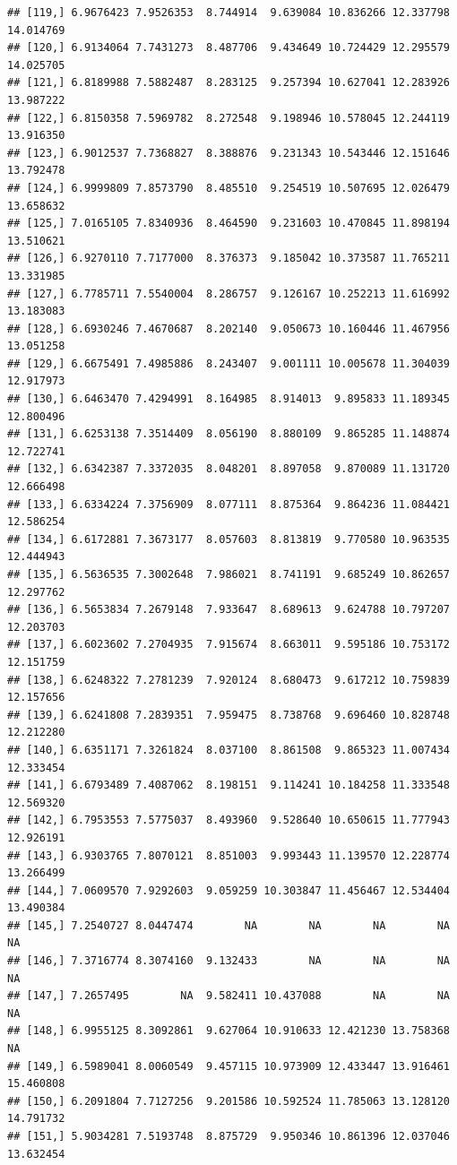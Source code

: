 \documentclass{article}\usepackage[]{graphicx}\usepackage[]{color}
\makeatletter
\newenvironment{kframe}{%
 \def\at@end@of@kframe{}%
 \ifinner\ifhmode%
  \def\at@end@of@kframe{\end{minipage}}%
  \begin{minipage}{\columnwidth}%
 \fi\fi%
 \def\FrameCommand##1{\hskip\@totalleftmargin \hskip-\fboxsep
 \colorbox{shadecolor}{##1}\hskip-\fboxsep
     \hskip-\linewidth \hskip-\@totalleftmargin \hskip\columnwidth}%
 \MakeFramed {\advance\hsize-\width
   \@totalleftmargin\z@ \linewidth\hsize
   \@setminipage}}%
 {\par\unskip\endMakeFramed%
 \at@end@of@kframe}
\newenvironment{knitrout}{}{} %
\makeatother
\begin{document}
\begin{knitrout}
\begin{kframe}
\begin{verbatim}
## [119,] 6.9676423 7.9526353  8.744914  9.639084 10.836266 12.337798 14.014769
## [120,] 6.9134064 7.7431273  8.487706  9.434649 10.724429 12.295579 14.025705
## [121,] 6.8189988 7.5882487  8.283125  9.257394 10.627041 12.283926 13.987222
## [122,] 6.8150358 7.5969782  8.272548  9.198946 10.578045 12.244119 13.916350
## [123,] 6.9012537 7.7368827  8.388876  9.231343 10.543446 12.151646 13.792478
## [124,] 6.9999809 7.8573790  8.485510  9.254519 10.507695 12.026479 13.658632
## [125,] 7.0165105 7.8340936  8.464590  9.231603 10.470845 11.898194 13.510621
## [126,] 6.9270110 7.7177000  8.376373  9.185042 10.373587 11.765211 13.331985
## [127,] 6.7785711 7.5540004  8.286757  9.126167 10.252213 11.616992 13.183083
## [128,] 6.6930246 7.4670687  8.202140  9.050673 10.160446 11.467956 13.051258
## [129,] 6.6675491 7.4985886  8.243407  9.001111 10.005678 11.304039 12.917973
## [130,] 6.6463470 7.4294991  8.164985  8.914013  9.895833 11.189345 12.800496
## [131,] 6.6253138 7.3514409  8.056190  8.880109  9.865285 11.148874 12.722741
## [132,] 6.6342387 7.3372035  8.048201  8.897058  9.870089 11.131720 12.666498
## [133,] 6.6334224 7.3756909  8.077111  8.875364  9.864236 11.084421 12.586254
## [134,] 6.6172881 7.3673177  8.057603  8.813819  9.770580 10.963535 12.444943
## [135,] 6.5636535 7.3002648  7.986021  8.741191  9.685249 10.862657 12.297762
## [136,] 6.5653834 7.2679148  7.933647  8.689613  9.624788 10.797207 12.203703
## [137,] 6.6023602 7.2704935  7.915674  8.663011  9.595186 10.753172 12.151759
## [138,] 6.6248322 7.2781239  7.920124  8.680473  9.617212 10.759839 12.157656
## [139,] 6.6241808 7.2839351  7.959475  8.738768  9.696460 10.828748 12.212280
## [140,] 6.6351171 7.3261824  8.037100  8.861508  9.865323 11.007434 12.333454
## [141,] 6.6793489 7.4087062  8.198151  9.114241 10.184258 11.333548 12.569320
## [142,] 6.7953553 7.5775037  8.493960  9.528640 10.650615 11.777943 12.926191
## [143,] 6.9303765 7.8070121  8.851003  9.993443 11.139570 12.228774 13.266499
## [144,] 7.0609570 7.9292603  9.059259 10.303847 11.456467 12.534404 13.490384
## [145,] 7.2540727 8.0447474        NA        NA        NA        NA        NA
## [146,] 7.3716774 8.3074160  9.132433        NA        NA        NA        NA
## [147,] 7.2657495        NA  9.582411 10.437088        NA        NA        NA
## [148,] 6.9955125 8.3092861  9.627064 10.910633 12.421230 13.758368        NA
## [149,] 6.5989041 8.0060549  9.457115 10.973909 12.433447 13.916461 15.460808
## [150,] 6.2091804 7.7127256  9.201586 10.592524 11.785063 13.128120 14.791732
## [151,] 5.9034281 7.5193748  8.875729  9.950346 10.861396 12.037046 13.632454

\end{verbatim}
\end{kframe}
\end{knitrout}
\end{document}
